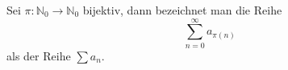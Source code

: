 Sei $\pi: \mathbb{N}_0 \to \mathbb{N}_0$ bijektiv, dann bezeichnet man die Reihe
$$\sum_{n=0}^\infty a_{\pi(n)}$$
als  der Reihe $\sum a_n$.